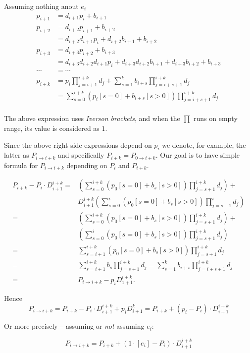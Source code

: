 \documentclass[10pt]{article}
\begin{document}
Assuming nothing anout \(e_i\)
\begin{align*}
p_{i+1} &= d_{i+1}p_i + b_{i+1}\\
p_{i+2} &= d_{i+2}p_{i+1} + b_{i+2} \\
        &= d_{i+2} d_{i+1} p_i + d_{i+2} b_{i+1} + b_{i+2} \\
p_{i+3} &= d_{i+3}p_{i+2} + b_{i+3} \\
       &= d_{i+3}d_{i+2}d_{i+1}p_i + d_{i+3}d_{i+2}b_{i+1} + 
          d_{i+3}b_{i+2} + b_{i+3} \\
\cdots &= \cdots \\
p_{i+k} &= p_i \prod_{j=i+1}^{i+k} d_j +
          \sum_{s=1}^k b_{i+s} \prod_{j=i+s+1}^{i+k} d_j \\
       &= \sum_{s=0}^{i+k} (p_i[s=0] + b_{i+s}[s>0]) \prod_{j=i+s+1}^{i+k} d_j \\
\end{align*}

The above expression uses \emph{Iverson brackets},
and when the \(\prod\) runs on empty range, its value
is considered as $1$.
 
Since the above right-side expressions depend on \(p_i\)
we denote, for example, the latter as \(P_{i \to i+k}\)
and specifically \(P_{i+k} = P_{0 \to i+k}\).
Our goal is to have simple formula for \(P_{i\to i+k}\)
depending on \(P_i\) and \(P_{i+k}\).


\begin{align*}
P_{i+k} - P_i \cdot D_{i+1}^{i+k} 
=& \left(\sum_{s=0}^{i+k} (p_0[s=0] + b_s[s>0]) \prod_{j=s+1}^{i+k} d_j\right) + \\
 & D_{i+1}^{i+k} 
   \left(
   \sum_{s=0}^i (p_0[s=0] + b_s[s>0]) \prod_{j=s+1}^i d_j
   \right) \\
=& \left(\sum_{s=0}^{i+k} (p_0[s=0] + b_s[s>0]) \prod_{j=s+1}^{i+k} d_j\right) + \\
 & \left(
   \sum_{s=0}^i (p_0[s=0] + b_s[s>0]) \prod_{j=s+1}^{i+k} d_j
   \right) \\
=& \sum_{s=i+1}^{i+k} (p_0[s=0] + b_s[s>0]) \prod_{j=s+1}^{i+k} d_j \\
=& \sum_{s=i+1}^{i+k} b_s \prod_{j=s+1}^{i+k} d_j 
    = \sum_{s=1}^k b_{i+s} \prod_{j=i+s+1}^{i+k} d_j \\
=& P_{i\to i+k} - p_i D_{1+1}^{i+k}.
\end{align*}

Hence 
\begin{equation*}
P_{i\to i+k} 
  = P_{i+k} - P_i \cdot D_{i+1}^{i+k} + p_i  D_{i+1}^k
  = P_{i+k} + (p_i - P_i) \cdot D_{i+1}^{i+k} 
\end{equation*}

Or more precisely -- assuming or \emph{not} assuming \(e_i\):

\begin{equation*}
P_{i\to i+k} = P_{i+k} + (1\cdot[e_i] - P_i) \cdot D_{i+1}^{i+k} 
\end{equation*}
\end{document}
